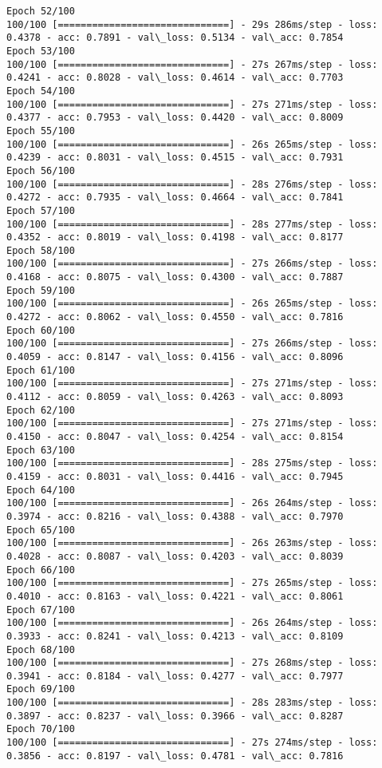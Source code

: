 \documentclass[11pt]{article}
\begin{document}
\begin{Verbatim}[commandchars=\\\{\}]
Epoch 52/100
100/100 [==============================] - 29s 286ms/step - loss: 0.4378 - acc: 0.7891 - val\_loss: 0.5134 - val\_acc: 0.7854
Epoch 53/100
100/100 [==============================] - 27s 267ms/step - loss: 0.4241 - acc: 0.8028 - val\_loss: 0.4614 - val\_acc: 0.7703
Epoch 54/100
100/100 [==============================] - 27s 271ms/step - loss: 0.4377 - acc: 0.7953 - val\_loss: 0.4420 - val\_acc: 0.8009
Epoch 55/100
100/100 [==============================] - 26s 265ms/step - loss: 0.4239 - acc: 0.8031 - val\_loss: 0.4515 - val\_acc: 0.7931
Epoch 56/100
100/100 [==============================] - 28s 276ms/step - loss: 0.4272 - acc: 0.7935 - val\_loss: 0.4664 - val\_acc: 0.7841
Epoch 57/100
100/100 [==============================] - 28s 277ms/step - loss: 0.4352 - acc: 0.8019 - val\_loss: 0.4198 - val\_acc: 0.8177
Epoch 58/100
100/100 [==============================] - 27s 266ms/step - loss: 0.4168 - acc: 0.8075 - val\_loss: 0.4300 - val\_acc: 0.7887
Epoch 59/100
100/100 [==============================] - 26s 265ms/step - loss: 0.4272 - acc: 0.8062 - val\_loss: 0.4550 - val\_acc: 0.7816
Epoch 60/100
100/100 [==============================] - 27s 266ms/step - loss: 0.4059 - acc: 0.8147 - val\_loss: 0.4156 - val\_acc: 0.8096
Epoch 61/100
100/100 [==============================] - 27s 271ms/step - loss: 0.4112 - acc: 0.8059 - val\_loss: 0.4263 - val\_acc: 0.8093
Epoch 62/100
100/100 [==============================] - 27s 271ms/step - loss: 0.4150 - acc: 0.8047 - val\_loss: 0.4254 - val\_acc: 0.8154
Epoch 63/100
100/100 [==============================] - 28s 275ms/step - loss: 0.4159 - acc: 0.8031 - val\_loss: 0.4416 - val\_acc: 0.7945
Epoch 64/100
100/100 [==============================] - 26s 264ms/step - loss: 0.3974 - acc: 0.8216 - val\_loss: 0.4388 - val\_acc: 0.7970
Epoch 65/100
100/100 [==============================] - 26s 263ms/step - loss: 0.4028 - acc: 0.8087 - val\_loss: 0.4203 - val\_acc: 0.8039
Epoch 66/100
100/100 [==============================] - 27s 265ms/step - loss: 0.4010 - acc: 0.8163 - val\_loss: 0.4221 - val\_acc: 0.8061
Epoch 67/100
100/100 [==============================] - 26s 264ms/step - loss: 0.3933 - acc: 0.8241 - val\_loss: 0.4213 - val\_acc: 0.8109
Epoch 68/100
100/100 [==============================] - 27s 268ms/step - loss: 0.3941 - acc: 0.8184 - val\_loss: 0.4277 - val\_acc: 0.7977
Epoch 69/100
100/100 [==============================] - 28s 283ms/step - loss: 0.3897 - acc: 0.8237 - val\_loss: 0.3966 - val\_acc: 0.8287
Epoch 70/100
100/100 [==============================] - 27s 274ms/step - loss: 0.3856 - acc: 0.8197 - val\_loss: 0.4781 - val\_acc: 0.7816

\end{Verbatim}
\end{document}
